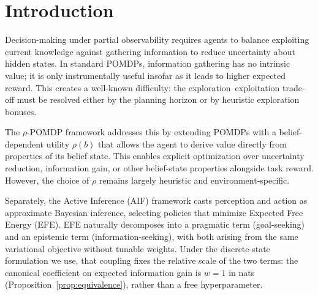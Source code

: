 \documentclass[runningheads]{llncs}
\begin{document}
\section{Introduction}

Decision-making under partial observability requires agents to balance exploiting current knowledge against gathering information to reduce uncertainty about hidden states. In standard POMDPs, information gathering has no intrinsic value; it is only instrumentally useful insofar as it leads to higher expected reward. This creates a well-known difficulty: the exploration--exploitation trade-off must be resolved either by the planning horizon or by heuristic exploration bonuses.

The $\rho$-POMDP framework \citep{araya2010} addresses this by extending POMDPs with a belief-dependent utility $\rho(b)$ that allows the agent to derive value directly from properties of its belief state. This enables explicit optimization over uncertainty reduction, information gain, or other belief-state properties alongside task reward. However, the choice of $\rho$ remains largely heuristic and environment-specific.

Separately, the Active Inference (AIF) framework \citep{friston2010, parr2019} casts perception and action as approximate Bayesian inference, selecting policies that minimize Expected Free Energy (EFE). EFE naturally decomposes into a pragmatic term (goal-seeking) and an epistemic term (information-seeking), with both arising from the same variational objective without tunable weights. Under the discrete-state formulation we use, that coupling fixes the relative scale of the two terms: the canonical coefficient on expected information gain is $w{=}1$ in nats (Proposition~\ref{prop:equivalence}), rather than a free hyperparameter.
\end{document}
